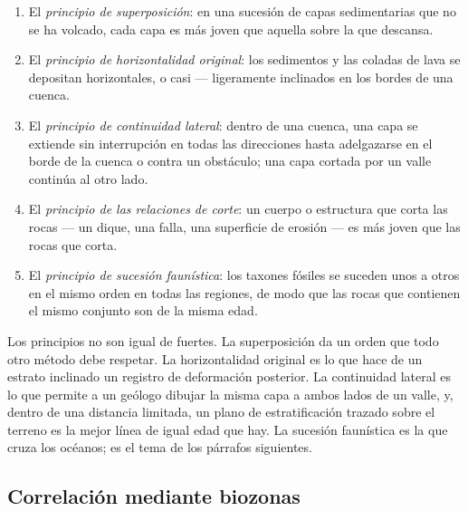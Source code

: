 \begin{definition}\label{def:b1:stratigraphic-scale:principles}
\begin{enumerate}
  \item El \emph{principio de superposición}: en una sucesión de capas sedimentarias que no se ha volcado, cada capa es más joven que aquella sobre la que descansa.
  \item El \emph{principio de horizontalidad original}: los sedimentos y las coladas de lava se depositan horizontales, o casi --- ligeramente inclinados en los bordes de una cuenca.
  \item El \emph{principio de continuidad lateral}: dentro de una cuenca, una capa se extiende sin interrupción en todas las direcciones hasta adelgazarse en el borde de la cuenca o contra un obstáculo; una capa cortada por un valle continúa al otro lado.
  \item El \emph{principio de las relaciones de corte}: un cuerpo o estructura que corta las rocas --- un dique, una falla, una superficie de erosión --- es más joven que las rocas que corta.
  \item El \emph{principio de sucesión faunística}: los taxones fósiles se suceden unos a otros en el mismo orden en todas las regiones, de modo que las rocas que contienen el mismo conjunto son de la misma edad.
\end{enumerate}
\end{definition}

Los principios no son igual de fuertes. La superposición da un orden que todo otro método debe respetar. La horizontalidad original es lo que hace de un estrato inclinado un registro de deformación posterior. La continuidad lateral es lo que permite a un geólogo dibujar la misma capa a ambos lados de un valle, y, dentro de una distancia limitada, un plano de estratificación trazado sobre el terreno es la mejor línea de igual edad que hay. La sucesión faunística es la que cruza los océanos; es el tema de los párrafos siguientes.

\subsection*{Correlación mediante biozonas}

